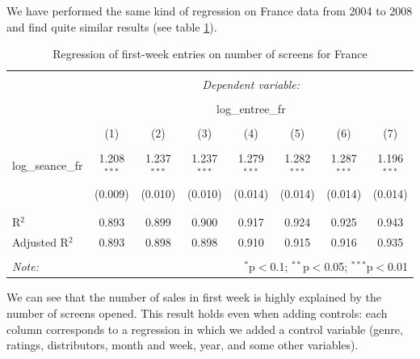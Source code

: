 
We have performed the same kind of regression on France data from 2004 to 2008 and find quite similar results (see table \ref{part2.1_tab3}).
\begin{table}[H] \centering 
	\caption{Regression of first-week entries on number of screens for France} 
	\label{part2.1_tab3} 
	\begin{tabular}{@{\extracolsep{5pt}}lccccccc} 
		\\[-1.8ex]\hline 
		\hline \\[-1.8ex] 
		& \multicolumn{7}{c}{\textit{Dependent variable:}} \\ 
		\cline{2-8} 
		\\[-1.8ex] & \multicolumn{7}{c}{log\_entree\_fr} \\ 
		\\[-1.8ex] & (1) & (2) & (3) & (4) & (5) & (6) & (7)\\ 
		\hline \\[-1.8ex] 
		log\_seance\_fr & 1.208$^{***}$ & 1.237$^{***}$ & 1.237$^{***}$ & 1.279$^{***}$ & 1.282$^{***}$ & 1.287$^{***}$ & 1.196$^{***}$ \\ 
		& (0.009) & (0.010) & (0.010) & (0.014) & (0.014) & (0.014) & (0.014) \\ 
		& & & & & & & \\ 
		\hline \\[-1.8ex] 
		R$^{2}$ & 0.893 & 0.899 & 0.900 & 0.917 & 0.924 & 0.925 & 0.943 \\ 
		Adjusted R$^{2}$ & 0.893 & 0.898 & 0.898 & 0.910 & 0.915 & 0.916 & 0.935 \\ 
		\hline 
		\hline \\[-1.8ex] 
		\textit{Note:}  & \multicolumn{7}{r}{$^{*}$p$<$0.1; $^{**}$p$<$0.05; $^{***}$p$<$0.01} \\ 
	\end{tabular} 
\end{table} 
We can see that the number of sales in first week is highly explained by the number of screens opened. This result holds even when adding controls: each column corresponds to a regression in which we added a control variable (genre, ratings, distributors, month and week, year, and some other variables).  

